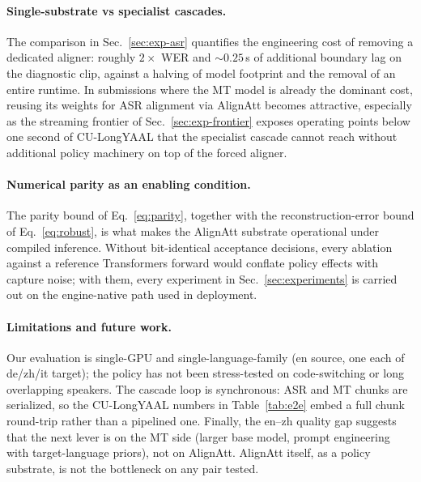 \documentclass[11pt,twocolumn]{article}
\begin{document}
\paragraph{Single-substrate vs specialist cascades.}
The comparison in Sec.~\ref{sec:exp-asr} quantifies the engineering
cost of removing a dedicated aligner: roughly $2\times$ WER and
${\sim}0.25$\,s of additional boundary lag on the diagnostic clip,
against a halving of model footprint and the removal of an entire
runtime. In submissions where the MT model is already the dominant
cost, reusing its weights for ASR alignment via AlignAtt becomes
attractive, especially as the streaming frontier of
Sec.~\ref{sec:exp-frontier} exposes operating points below one second
of CU-LongYAAL that the specialist cascade cannot reach without
additional policy machinery on top of the forced aligner.

\paragraph{Numerical parity as an enabling condition.}
The parity bound of Eq.~\eqref{eq:parity}, together with the
reconstruction-error bound of Eq.~\eqref{eq:robust}, is what makes the
AlignAtt substrate operational under compiled inference. Without
bit-identical acceptance decisions, every ablation against a reference
Transformers forward would conflate policy effects with capture noise;
with them, every experiment in Sec.~\ref{sec:experiments} is carried
out on the engine-native path used in deployment.

\paragraph{Limitations and future work.}
Our evaluation is single-GPU and single-language-family (en source, one
each of de/zh/it target); the policy has not been stress-tested on
code-switching or long overlapping speakers. The cascade loop is
synchronous: ASR and MT chunks are serialized, so the CU-LongYAAL
numbers in Table~\ref{tab:e2e} embed a full chunk round-trip rather
than a pipelined one. Finally, the en--zh quality gap suggests that the next
lever is on the MT side (larger base model, prompt engineering with
target-language priors), not on AlignAtt. AlignAtt itself, as a policy
substrate, is not the bottleneck on any pair tested.
\end{document}
